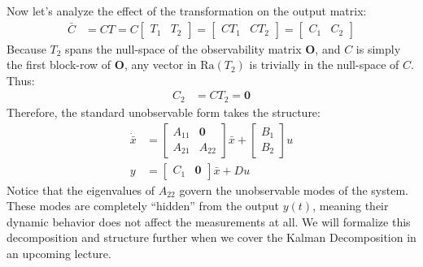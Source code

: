 \documentclass[twoside]{article}
\begin{document}
Now let's analyze the effect of the transformation on the output matrix:
%
\begin{align*}
    \bar{C} &= C T = C \left[ \begin{array}{c|c} T_1 & T_2 \end{array} \right] = \left[ \begin{array}{c|c} C T_1 & C T_2  \end{array} \right] = \left[ \begin{array}{c|c} C_1 & C_2  \end{array} \right]
\end{align*}
%
Because $T_2$ spans the null-space of the observability matrix $\mathbf{O}$, and $C$ is simply the first block-row of $\mathbf{O}$, any vector in $\mathrm{Ra}(T_2)$ is trivially in the null-space of $C$. Thus:
\begin{align*}
    C_2 &= C T_2 = \mathbf{0}
\end{align*}
%
Therefore, the standard unobservable form takes the structure:
%
\begin{align*}
\dot{\bar{x}} &= \left[ \begin{array}{c|c} A_{11} & \mathbf{0} \\ \hline A_{21} & A_{22}  \end{array} \right] \bar{x} + \left[ \begin{array}{c} B_1 \\ B_2 \end{array} \right] u
\\
y &= \left[ \begin{array}{c|c} C_1 & \mathbf{0} \end{array} \right] \bar{x} + D u
\end{align*}
%
Notice that the eigenvalues of $A_{22}$ govern the unobservable modes of the system. These modes are completely ``hidden'' from the output $y(t)$, meaning their dynamic behavior does not affect the measurements at all. We will formalize this decomposition and structure further when we cover the Kalman Decomposition in an upcoming lecture.
\end{document}

